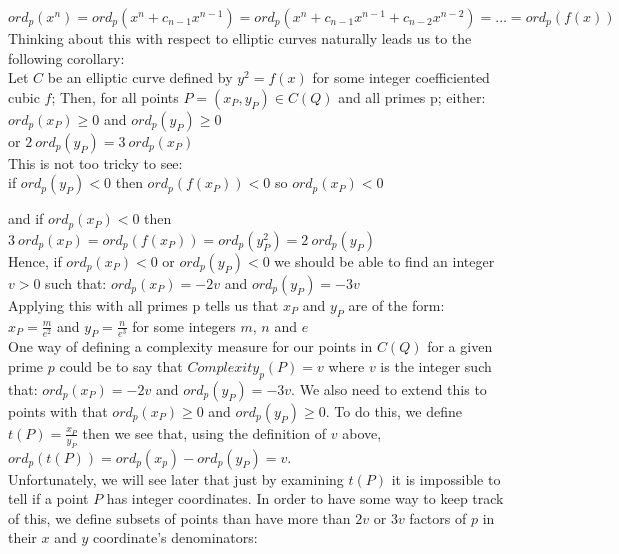 \documentclass{article}
\begin{document}
$ord_p(x^n) = ord_p(x^n + c_{n-1}x^{n-1}) = ord_p(x^n + c_{n-1}x^{n-1} + c_{n-2}x^{n-2}) = \dots = ord_p(f(x))$\\


Thinking about this with respect to elliptic curves naturally leads us to the following corollary:\\

Let $C$ be an elliptic curve defined by $y^2 = f(x)$ for some integer coefficiented cubic $f$; Then, for all points $P = (x_P, y_P) \in C(Q)$ and all primes p; either:\\

$ord_p(x_P) \geq 0$ \quad and \quad  $ord_p(y_P) \geq 0$ \\

or \quad $ 2 \ ord_p(y_P) = 3 \ ord_p(x_P)$\\

This is not too tricky to see:\\

if \quad $ord_p(y_P) < 0$ \quad then \quad $ord_p(f(x_P)) < 0$ \quad so \quad $ord_p(x_P) < 0$

and if \quad $ord_p(x_P) < 0$ \quad then \quad $3 \ ord_p(x_P) = ord_p(f(x_P)) = ord_p(y_P^2) = 2 \ ord_p(y_P)$\\

Hence, if $ord_p(x_P) < 0$ or $ord_p(y_P) < 0$ we should be able to find an integer $v > 0$ such that: $ord_p(x_P) = -2v$ and $ord_p(y_P) = -3v$\\

Applying this with all primes p tells us that $x_P$ and $y_P$ are of the form:\\

$x_P = \frac{m}{e^2}$ \quad and \quad $y_P = \frac{n}{e^3}$ for some integers $m$, $n$ and $e$\\

One way of defining a complexity measure for our points in $C(Q)$ for a given prime $p$ could be to say that $Complexity_p(P) = v$ where $v$ is the integer such that:  $ord_p(x_P) = -2v$ and $ord_p(y_P) = -3v$. We also need to extend this to points with that $ord_p(x_P) \geq 0$ and $ord_p(y_P) \geq 0$. To do this, we define $t(P) = \frac{x_P}{y_P}$ then we see that, using the definition of $v$ above, $ord_p(t(P)) = ord_p(x_p) - ord_p(y_P) = v$. \\ 

Unfortunately, we will see later that just by examining $t(P)$ it is impossible to tell if a point $P$ has integer coordinates. In order to have some way to keep track of this, we define subsets of points than have more than $2v$ or $3v$ factors of $p$ in their $x$ and $y$ coordinate's denominators:\\
\end{document}
